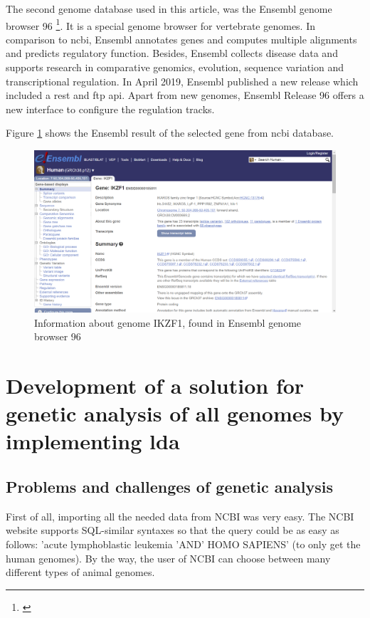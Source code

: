 The second genome database used in this article, was the Ensembl genome browser 96 \footnote{\autocite{ensembl}}. It is a special genome browser for vertebrate genomes. In comparison to \ac{ncbi}, Ensembl annotates genes and computes multiple alignments and predicts regulatory function. Besides, Ensembl collects disease data and supports research in comparative genomics, evolution, sequence variation and transcriptional regulation.
In April 2019, Ensembl published a new release which included a \ac{rest} and \ac{ftp} \ac{api}. Apart from new genomes, Ensembl Release 96 offers a new interface to configure the regulation tracks.

Figure \ref{ensembl_result} shows the Ensembl result of the selected gene from \ac{ncbi} database.

\begin{figure}[htbp]
	\centering
	\includegraphics[width=1\textwidth]{Image/ensembl_ikzf1.png}
	\caption{Information about genome IKZF1, found in Ensembl genome browser 96}
	\label{ensembl_result}
\end{figure}

\chapter{Development of a solution for genetic analysis of \ac{all} genomes by implementing \ac{lda}}\label{development}
\section{Problems and challenges of genetic analysis}\label{problems_challenges}

First of all, importing all the needed data from NCBI was very easy. The NCBI website supports SQL-similar syntaxes so that the query could be as easy as follows: 'acute lymphoblastic leukemia 'AND' HOMO SAPIENS' (to only get the human genomes). By the way, the user of NCBI can choose between many different types of animal genomes.

